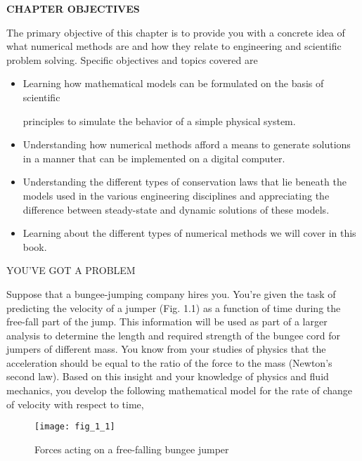 \documentclass[../main.tex]{subfiles}
\begin{document}
\begin{center}
\Large{\textbf{CHAPTER OBJECTIVES}}
\end{center}

\normalsize{The primary objective of this chapter is to provide you with a concrete idea of what
numerical methods are and how they relate to engineering and scientific problem
solving. Specific objectives and topics covered are}

\begin{itemize}

\item Learning how mathematical models can be formulated on the basis of scientific

principles to simulate the behavior of a simple physical system.
\item Understanding how numerical methods afford a means to generate solutions in a
manner that can be implemented on a digital computer.

\item Understanding the different types of conservation laws that lie beneath the models
used in the various engineering disciplines and appreciating the difference
between steady-state and dynamic solutions of these models.

\item Learning about the different types of numerical methods we will cover in this
book.

\end{itemize}
\Large{YOU'VE GOT A PROBLEM}


\normalsize{Suppose that a bungee-jumping company hires you. You’re given the task of predicting the velocity of a jumper (Fig. 1.1)  as a function of time during the free-fall part
of the jump. This information will be used as part of a larger analysis to determine the
length and required strength of the bungee cord for jumpers of different mass.
You know from your studies of physics that the acceleration should be equal to the ratio
of the force to the mass (Newton’s second law). Based on this insight and your knowledge of physics and fluid mechanics, you develop the following mathematical model for the rate
of change of velocity with respect to time, }
\newpage

\begin{wrapfigure}{l}{0.25\textwidth}
    \centering
    \texttt{[image: fig\_1\_1]}
   \caption{\textsf{Forces acting on a free-falling bungee jumper}}
   \label{fig:fig_1_1}
\end{wrapfigure}
\end{document}
